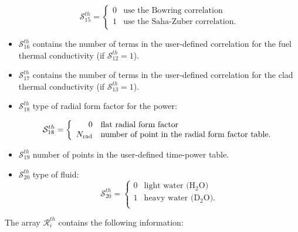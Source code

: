 \begin{itemize}
\begin{displaymath} \mathcal{S}^{th}_{15} = \left\{
\begin{array}{rl}
 0 & \textrm{use the Bowring correlation} \\
 1 & \textrm{use the Saha-Zuber correlation.} \\
\end{array} \right.
\end{displaymath}

\item $\mathcal{S}^{th}_{16}$ contains the number of terms in the user-defined correlation for the fuel thermal conductivity (if $\mathcal{S}^{th}_{12}=1$).
\item $\mathcal{S}^{th}_{17}$ contains the number of terms in the user-defined correlation for the clad thermal conductivity (if $\mathcal{S}^{th}_{13}=1$).
\item $\mathcal{S}^{th}_{18}$ type of radial form factor for the power:

\begin{displaymath} \mathcal{S}^{th}_{18} = \left\{
\begin{array}{rl}
 0 & \textrm{flat radial form factor} \\
 N_{\rm rad} & \textrm{number of point in the radial form factor table.} \\
\end{array} \right.
\end{displaymath}

\item $\mathcal{S}^{th}_{19}$ number of points in the user-defined time-power table.

\item $\mathcal{S}^{th}_{20}$ type of fluid:
\begin{displaymath} \mathcal{S}^{th}_{20} = \left\{
\begin{array}{rl}
 0 & \textrm{light water (H$_2$O)} \\
 1 & \textrm{heavy water (D$_2$O).} \\
\end{array} \right.
\end{displaymath}

\end{itemize}

The array $\mathcal{R}^{th}_{i}$ contains the following information: 

